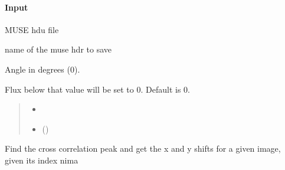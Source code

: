 \documentclass[letterpaper,10pt,english]{sphinxmanual}
\begin{document}
\begin{fulllineitems}
\begin{fulllineitems}
\paragraph{Input}
\label{\detokenize{api/pymusepipe:id3}}\begin{description}
\sphinxAtStartPar
MUSE hdu file

\sphinxAtStartPar
name of the muse hdr to save

\sphinxAtStartPar
Angle in degrees (0).

\sphinxAtStartPar
Flux below that value will be set to 0.
Default is 0.

\end{description}
\begin{quote}\begin{description}
\begin{itemize}
\item {} 
\sphinxAtStartPar
{}

\item {} 
\sphinxAtStartPar
{} ()

\end{itemize}

\end{description}\end{quote}

\end{fulllineitems}


\begin{fulllineitems}
\label{\detokenize{api/pymusepipe:pymusepipe.align_pipe.AlignMuseDataset.find_cross_peak_ima}}
\pysigstartsignatures
{}
\pysigstopsignatures
\sphinxAtStartPar
Find the cross correlation peak and get the x and y shifts
for a given image, given its index nima



\end{fulllineitems}
\end{fulllineitems}
\end{document}
